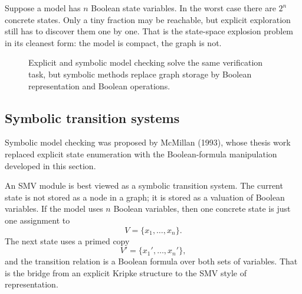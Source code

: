 Suppose a model has $n$ Boolean state variables.  In the worst case there are
$2^n$ concrete states.  Only a tiny fraction may be reachable, but explicit
exploration still has to discover them one by one.  That is the state-space
explosion problem in its cleanest form: the model is compact, the graph is not.

\begin{figure}[ht]
  \centering
  \caption{Explicit and symbolic model checking solve the same verification
           task, but symbolic methods replace graph storage by Boolean
           representation and Boolean operations.}
  \label{fig:explicit-vs-symbolic}
\end{figure}

\subsection{Symbolic transition systems}

Symbolic model checking was proposed by McMillan (1993), whose thesis work
replaced explicit state enumeration with the Boolean-formula manipulation
developed in this section.

An SMV module is best viewed as a symbolic transition system.  The current
state is not stored as a node in a graph; it is stored as a valuation of
Boolean variables.  If the model uses $n$ Boolean variables, then one concrete
state is just one assignment to
\[
  V = \{x_1,\dots,x_n\}.
\]
The next state uses a primed copy
\[
  V' = \{x_1',\dots,x_n'\},
\]
and the transition relation is a Boolean formula over both sets of variables.
That is the bridge from an explicit Kripke structure to the SMV style of
representation.

